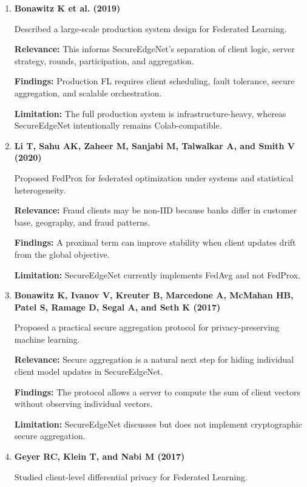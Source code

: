 \begin{enumerate}
    \item \textbf{Bonawitz K et al. (2019) \cite{ref16}}

    Described a large-scale production system design for Federated Learning.

    \textbf{Relevance:} This informs SecureEdgeNet's separation of client logic, server strategy, rounds, participation, and aggregation.

    \textbf{Findings:} Production FL requires client scheduling, fault tolerance, secure aggregation, and scalable orchestration.

    \textbf{Limitation:} The full production system is infrastructure-heavy, whereas SecureEdgeNet intentionally remains Colab-compatible.

    \item \textbf{Li T, Sahu AK, Zaheer M, Sanjabi M, Talwalkar A, and Smith V (2020) \cite{ref17}}

    Proposed FedProx for federated optimization under systems and statistical heterogeneity.

    \textbf{Relevance:} Fraud clients may be non-IID because banks differ in customer base, geography, and fraud patterns.

    \textbf{Findings:} A proximal term can improve stability when client updates drift from the global objective.

    \textbf{Limitation:} SecureEdgeNet currently implements FedAvg and not FedProx.

    \item \textbf{Bonawitz K, Ivanov V, Kreuter B, Marcedone A, McMahan HB, Patel S, Ramage D, Segal A, and Seth K (2017) \cite{ref18}}

    Proposed a practical secure aggregation protocol for privacy-preserving machine learning.

    \textbf{Relevance:} Secure aggregation is a natural next step for hiding individual client model updates in SecureEdgeNet.

    \textbf{Findings:} The protocol allows a server to compute the sum of client vectors without observing individual vectors.

    \textbf{Limitation:} SecureEdgeNet discusses but does not implement cryptographic secure aggregation.

    \item \textbf{Geyer RC, Klein T, and Nabi M (2017) \cite{ref19}}

    Studied client-level differential privacy for Federated Learning.


\end{enumerate}
